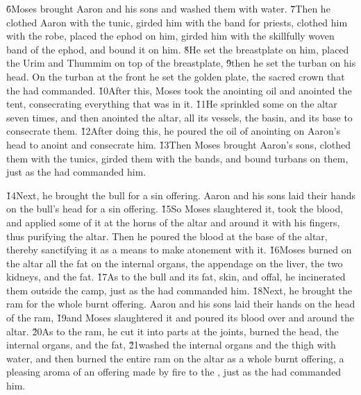 \v{6}Moses brought Aaron and his sons and washed them with water. \v{7}Then he clothed Aaron with the tunic, girded him with the band for priests, clothed him with the robe, placed the ephod on him, girded him with the skillfully woven band of the ephod, and bound it on him. \v{8}He set the breastplate on him, placed the Urim and Thummim on top of the breastplate, \v{9}then he set the turban on his head. On the turban at the front he set the golden plate, the sacred crown that the  had commanded. \v{10}After this, Moses took the anointing oil and anointed the tent, consecrating everything that was in it. \v{11}He sprinkled some on the altar seven times, and then anointed the altar, all its vessels, the basin, and its base to consecrate them. \v{12}After doing this, he poured the oil of anointing on Aaron's head to anoint and consecrate him. \v{13}Then Moses brought Aaron's sons, clothed them with the tunics, girded them with the bands, and bound turbans on them, just as the  had commanded him.

\v{14}Next, he brought the bull for a sin offering. Aaron and his sons laid their hands on the bull's head for a sin offering. \v{15}So Moses slaughtered it, took the blood, and applied some of it at the horns of the altar and around it with his fingers, thus purifying the altar. Then he poured the blood at the base of the altar, thereby sanctifying it as a means to make atonement with it. \v{16}Moses burned on the altar all the fat on the internal organs, the appendage on the liver, the two kidneys, and the fat. \v{17}As to the bull and its fat, skin, and offal, he incinerated them outside the camp, just as the  had commanded him. \v{18}Next, he brought the ram for the whole burnt offering. Aaron and his sons laid their hands on the head of the ram, \v{19}and Moses slaughtered it and poured its blood over and around the altar. \v{20}As to the ram, he cut it into parts at the joints, burned the head, the internal organs, and the fat, \v{21}washed the internal organs and the thigh with water, and then burned the entire ram on the altar as a whole burnt offering, a pleasing aroma of an offering made by fire to the , just as the  had commanded him.

